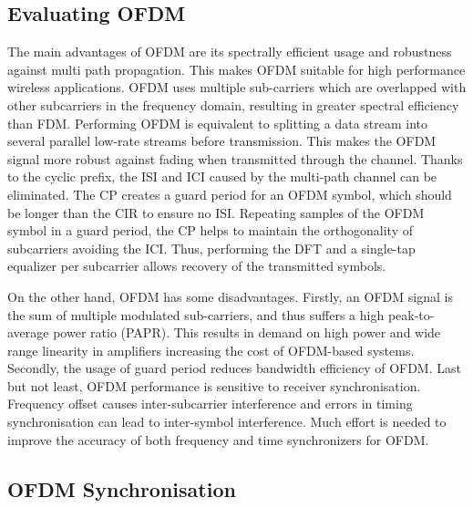 \subsection{Evaluating OFDM}

The main advantages of OFDM are its spectrally efficient usage and robustness against multi path propagation.
This makes OFDM suitable for high performance wireless applications. 
OFDM uses multiple sub-carriers which are overlapped with other subcarriers in the frequency domain, resulting in greater spectral efficiency than FDM. 
Performing OFDM is equivalent to splitting a data stream into several parallel low-rate streams before transmission.
This makes the OFDM signal more robust against fading when transmitted through the channel. 
Thanks to the cyclic prefix, the ISI and ICI caused by the multi-path channel can be eliminated. 
The CP creates a guard period for an OFDM symbol, which should be longer than the CIR to ensure no ISI.
Repeating samples of the OFDM symbol in a guard period, the CP helps to maintain the orthogonality of subcarriers avoiding the ICI. 
Thus, performing the DFT and a single-tap equalizer per subcarrier allows recovery of the transmitted symbols.

On the other hand, OFDM has some disadvantages. 
Firstly, an OFDM signal is the sum of multiple modulated sub-carriers, and thus suffers a high peak-to-average power ratio (PAPR). 
This results in demand on high power and wide range linearity in amplifiers increasing the cost of OFDM-based systems.
Secondly, the usage of guard period reduces bandwidth efficiency of OFDM.
Last but not least, OFDM performance is sensitive to receiver synchronisation. Frequency offset causes inter-subcarrier interference and errors in timing synchronisation can lead to inter-symbol interference.
Much effort is needed to improve the accuracy of both frequency and time synchronizers for OFDM.



\subsection{OFDM Synchronisation}

